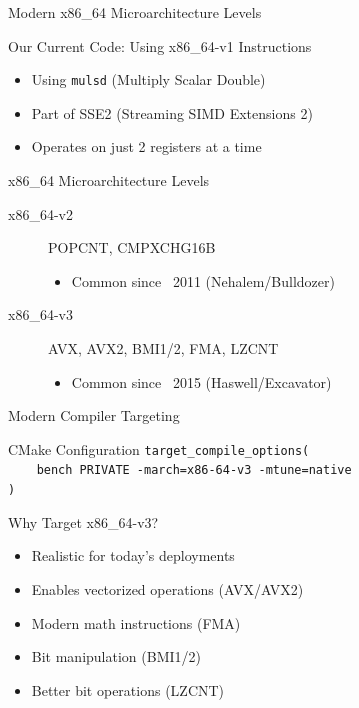 \documentclass{beamer}
\begin{document}
\begin{frame}{Modern x86\_64 Microarchitecture Levels}
    \begin{block}{Our Current Code: Using x86\_64-v1 Instructions}
        \begin{itemize}
            \item Using \texttt{mulsd} (Multiply Scalar Double)
            \item Part of SSE2 (Streaming SIMD Extensions 2)
            \item Operates on just 2 registers at a time
        \end{itemize}
    \end{block}

    \begin{block}{x86\_64 Microarchitecture Levels}
        \begin{description}
            \item[x86\_64-v2] POPCNT, CMPXCHG16B
            \begin{itemize}
                \item Common since ~2011 (Nehalem/Bulldozer)
            \end{itemize}
            
            \item[x86\_64-v3] AVX, AVX2, BMI1/2, FMA, LZCNT
            \begin{itemize}
                \item Common since ~2015 (Haswell/Excavator)
            \end{itemize}
        \end{description}
    \end{block}
\end{frame}

\begin{frame}{Modern Compiler Targeting}
    \begin{block}{CMake Configuration}
        \texttt{target\_compile\_options(}\\
        \texttt{~~~~bench PRIVATE -march=x86-64-v3 -mtune=native}\\
        \texttt{)}
    \end{block}

    \begin{block}{Why Target x86\_64-v3?}
        \begin{itemize}
            \item Realistic for today's deployments
            \item Enables vectorized operations (AVX/AVX2)
            \item Modern math instructions (FMA)
            \item Bit manipulation (BMI1/2)
            \item Better bit operations (LZCNT)
        \end{itemize}
    \end{block}
\end{frame}
\end{document}
